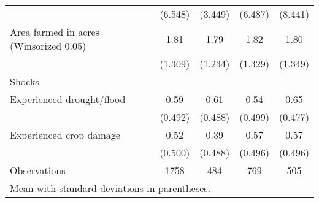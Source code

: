 {\begin{tabular}{l*{4}{c}}
                    &     (6.548)         &     (3.449)         &     (6.487)         &     (8.441)         \\
[1em]
Area farmed in acres (Winsorized 0.05)&        1.81         &        1.79         &        1.82         &        1.80         \\
                    &     (1.309)         &     (1.234)         &     (1.329)         &     (1.349)         \\
[1em]
Shocks              &                     &                     &                     &                     \\
[1em]
Experienced drought/flood&        0.59         &        0.61         &        0.54         &        0.65         \\
                    &     (0.492)         &     (0.488)         &     (0.499)         &     (0.477)         \\
[1em]
Experienced crop damage&        0.52         &        0.39         &        0.57         &        0.57         \\
                    &     (0.500)         &     (0.488)         &     (0.496)         &     (0.496)         \\
\hline
Observations        &        1758         &         484         &         769         &         505         \\
\hline\hline
\multicolumn{5}{l}{\footnotesize Mean with standard deviations in parentheses.}\\
\end{tabular}
}
